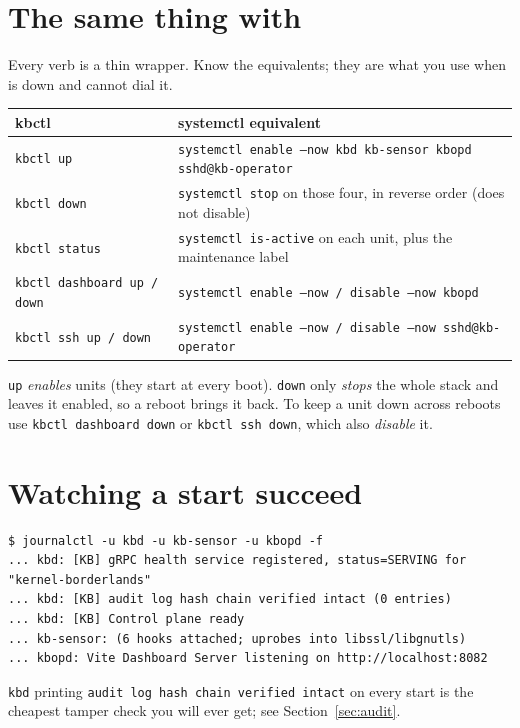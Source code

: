 \section{The same thing with }
Every  verb is a thin wrapper. Know the equivalents; they are what you use when  is down
and  cannot dial it.
\begin{center}\small
\begin{tabularx}{\textwidth}{@{}L{4.6cm}Y@{}}
\toprule
\textbf{kbctl} & \textbf{systemctl equivalent}\\
\midrule
\texttt{kbctl up} & \texttt{systemctl enable --now kbd kb-sensor kbopd sshd@kb-operator}\\
\texttt{kbctl down} & \texttt{systemctl stop} on those four, in reverse order (does not disable)\\
\texttt{kbctl status} & \texttt{systemctl is-active} on each unit, plus the maintenance label\\
\texttt{kbctl dashboard up / down} & \texttt{systemctl enable --now / disable --now kbopd}\\
\texttt{kbctl ssh up / down} & \texttt{systemctl enable --now / disable --now sshd@kb-operator}\\
\bottomrule
\end{tabularx}
\end{center}
\begin{kbnote}
\texttt{up} \emph{enables} units (they start at every boot). \texttt{down} only \emph{stops} the whole stack and
leaves it enabled, so a reboot brings it back. To keep a unit down across reboots use
\texttt{kbctl dashboard down} or \texttt{kbctl ssh down}, which also \emph{disable} it.
\end{kbnote}

\section{Watching a start succeed}
\begin{lstlisting}[style=console]
$ journalctl -u kbd -u kb-sensor -u kbopd -f
... kbd: [KB] gRPC health service registered, status=SERVING for "kernel-borderlands"
... kbd: [KB] audit log hash chain verified intact (0 entries)
... kbd: [KB] Control plane ready
... kb-sensor: (6 hooks attached; uprobes into libssl/libgnutls)
... kbopd: Vite Dashboard Server listening on http://localhost:8082
\end{lstlisting}
\texttt{kbd} printing \texttt{audit log hash chain verified intact} on every start is the cheapest tamper check
you will ever get; see Section~\ref{sec:audit}.

